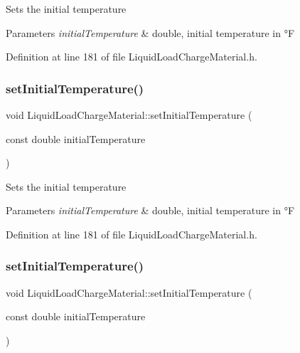 Sets the initial temperature 
\begin{DoxyParams}{Parameters}
{\em initial\+Temperature} & double, initial temperature in °F \\
\hline
\end{DoxyParams}


Definition at line 181 of file Liquid\+Load\+Charge\+Material.\+h.

\mbox{\label{class_liquid_load_charge_material_ac30600ef82db69934e8c08e4a774bb03}} 
\subsubsection{\texorpdfstring{set\+Initial\+Temperature()}{setInitialTemperature()}\hspace{0.1cm}{\footnotesize\ttfamily [2/3]}}
{\footnotesize\ttfamily void Liquid\+Load\+Charge\+Material\+::set\+Initial\+Temperature (\begin{DoxyParamCaption}\item[{const double}]{initial\+Temperature }\end{DoxyParamCaption})\hspace{0.3cm}{\ttfamily [inline]}}

Sets the initial temperature 
\begin{DoxyParams}{Parameters}
{\em initial\+Temperature} & double, initial temperature in °F \\
\hline
\end{DoxyParams}


Definition at line 181 of file Liquid\+Load\+Charge\+Material.\+h.

\mbox{\label{class_liquid_load_charge_material_ac30600ef82db69934e8c08e4a774bb03}} 
\subsubsection{\texorpdfstring{set\+Initial\+Temperature()}{setInitialTemperature()}\hspace{0.1cm}{\footnotesize\ttfamily [3/3]}}
{\footnotesize\ttfamily void Liquid\+Load\+Charge\+Material\+::set\+Initial\+Temperature (\begin{DoxyParamCaption}\item[{const double}]{initial\+Temperature }\end{DoxyParamCaption})\hspace{0.3cm}{\ttfamily [inline]}}

